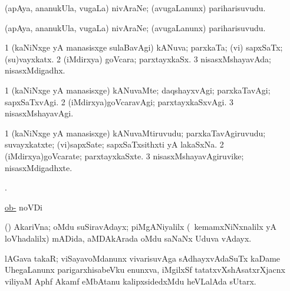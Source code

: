 \bentry
{}
\gl{\sakirx}
\bmng
(apAya, ananukUla, \mo vugaLa) nivAraNe; (avugaLanunx) pariharisuvudu. 
\emng
\eentry

\bentry
{}
\gl{\nA}
\bmng
(apAya, ananukUla, \mo vugaLa) nivAraNe; (avugaLanunx) pariharisuvudu. 
\emng
\eentry

\bentry
{}
\gl{\gu}
\bmng
\bnum
\num{1} (kaNiNxge yA manasisxge sulaBavAgi) kANuva; parxkaTa; (vi) sapxSaTx; (su)vayxkatx. 
\num{2} (iMdirxya) goVcara; parxtayxkaSx. 
\num{3} nisasxMshayavAda; nisasxMdigadhx. 
\enum
\emng
\eentry

\bentry
{}
\gl{\kirxvi}
\bmng
\bnum
\num{1} (kaNiNxge yA manasisxge) kANuvaMte; daqshayxvAgi; parxkaTavAgi; sapxSaTxvAgi. 
\num{2} (iMdirxya)goVcaravAgi; parxtayxkaSxvAgi. 
\num{3} nisasxMshayavAgi. 
\enum
\emng
\eentry

\bentry
{}
\gl{\nA}
\bmng
\bnum
\num{1} (kaNiNxge yA manasisxge) kANuvaMtiruvudu; parxkaTavAgiruvudu; suvayxkatxte; (vi)sapxSate; sapxSaTxsithxti yA lakaSxNa. 
\num{2} (iMdirxya)goVcarate; parxtayxkaSxte. 
\num{3} nisasxMshayavAgiruvike; nisasxMdigadhxte. 
\enum
\emng
\eentry

\bentry
{}
\gl{\saMkiSx}
\bmng
{}. 
\emng
\eentry

\bentry
{}
\gl{\pUparx}
\bmng
\hyperlink{ob-}{ob-} noVDi 
\emng
\eentry

\bentry
{}
\gl{\nA}
\bmng
(\saM) AkariVna; oMdu suSiravAdayx; piMgANiyalilx (\sA\ kemamxNiNxnalilx yA loVhadalilx) mADida, aMDAkArada oMdu saNaNx Uduva vAdayx.  
\emng
\eentry

\bentry
{}
\gl{\nA}
\bmng
lAGava takaR; viSayavoMdanunx vivarisuvAga sAdhayxvAdaSuTx kaDame UhegaLanunx parigarxhisabeVku enunxva, iMgilxSf tatatxvXshAsatxrXjacnx viliyaM Aphf Akamf eMbAtanu kalipxsidedxMdu heVLalAda sUtarx. 
\emng
\eentry


